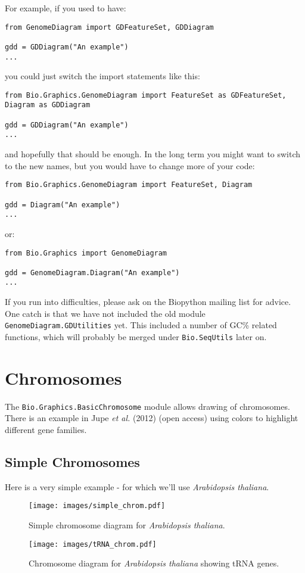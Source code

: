 For example, if you used to have:
\begin{verbatim}
from GenomeDiagram import GDFeatureSet, GDDiagram

gdd = GDDiagram("An example")
...
\end{verbatim}
you could just switch the import statements like this:
\begin{verbatim}
from Bio.Graphics.GenomeDiagram import FeatureSet as GDFeatureSet, Diagram as GDDiagram

gdd = GDDiagram("An example")
...
\end{verbatim}
and hopefully that should be enough.  In the long term you might want to
switch to the new names, but you would have to change more of your code:
\begin{verbatim}
from Bio.Graphics.GenomeDiagram import FeatureSet, Diagram

gdd = Diagram("An example")
...
\end{verbatim}
or:
\begin{verbatim}
from Bio.Graphics import GenomeDiagram

gdd = GenomeDiagram.Diagram("An example")
...
\end{verbatim}

If you run into difficulties, please ask on the Biopython mailing list for
advice. One catch is that we have not included the old module
\verb|GenomeDiagram.GDUtilities| yet.  This included a number of
GC\% related functions, which will probably be merged under
\verb|Bio.SeqUtils| later on.

\section{Chromosomes}

The \verb|Bio.Graphics.BasicChromosome| module allows drawing of chromosomes.
There is an example in Jupe \textit{et al.} (2012) \cite{jupe2012}
(open access) using colors to highlight different gene families.

\subsection{Simple Chromosomes}
Here is a very simple example - for which we'll use \textit{Arabidopsis thaliana}.

\begin{figure}[p]
\centering
\texttt{[image: images/simple\_chrom.pdf]}
\caption{Simple chromosome diagram for \textit{Arabidopsis thaliana}.}
\label{fig:simplechromosome}
\end{figure}
\begin{figure}[p]
\centering
\texttt{[image: images/tRNA\_chrom.pdf]}
\caption{Chromosome diagram for \textit{Arabidopsis thaliana} showing tRNA genes.}
\label{fig:trnachromosome}
\end{figure}

